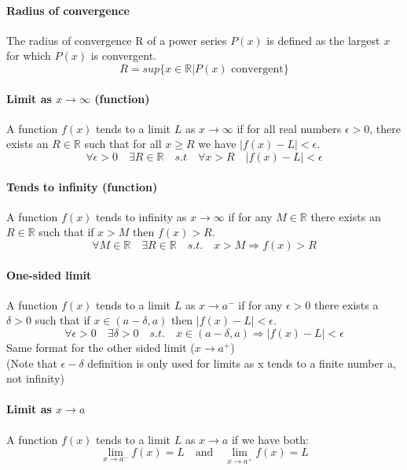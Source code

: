 \documentclass{article}
\newcommand{\R}{\mathbb{R}}
\begin{document}
\paragraph{Radius of convergence}
The radius of convergence R of a power series $ P(x) $ is defined as the largest $ x $ for which $ P(x) $ is convergent.
\begin{equation}
R = sup\{x \in \R | P(x) \textrm{ convergent}\}
\end{equation}
\paragraph{Limit as $ x \to \infty $ (function)}
A function $ f(x) $ tends to a limit $ L $ as $ x \to \infty $ if for all real numbers $ \epsilon > 0 $, there exists an $ R \in \R $ such that for all $ x \geq R $ we have $ |f(x) - L| < \epsilon $.
\begin{equation}
\forall \epsilon > 0 \quad \exists R \in \R \quad s.t \quad \forall x > R \quad |f(x) - L| < \epsilon
\end{equation}
\paragraph{Tends to infinity (function)}
A function $ f(x) $ tends to infinity as $ x \to \infty $ if for any $ M \in \R $ there exists an $ R \in \R $ such that if $ x > M $ then $ f(x) > R $.
\begin{equation}
\forall M \in \R \quad \exists R \in \R \quad s.t. \quad x > M \Rightarrow f(x) > R
\end{equation}
\paragraph{One-sided limit}
A function $ f(x) $ tends to a limit $ L $ as $ x \to a^{-} $ if for any $ \epsilon > 0 $ there exists a $ \delta > 0 $ such that if $ x \in (a - \delta, a) $ then $ |f(x) - L| < \epsilon $.
\begin{equation}
\forall \epsilon > 0 \quad \exists \delta > 0 \quad s.t. \quad x \in (a - \delta, a) \Rightarrow |f(x) - L| < \epsilon
\end{equation}
\noindent Same format for the other sided limit ($ x \to a^{+} $)
\\
(Note that $ \epsilon - \delta $ definition is only used for limits as x tends to a finite number a, not infinity)
\paragraph{Limit as $ x \to a $}
A function $ f(x) $ tends to a limit $ L $ as $ x \to a $ if we have both:
\begin{equation}
\lim_{x \to a^{-}}f(x) = L \quad \textrm{and} \quad \lim_{x \to a^{+}}f(x) = L
\end{equation}
\end{document}
